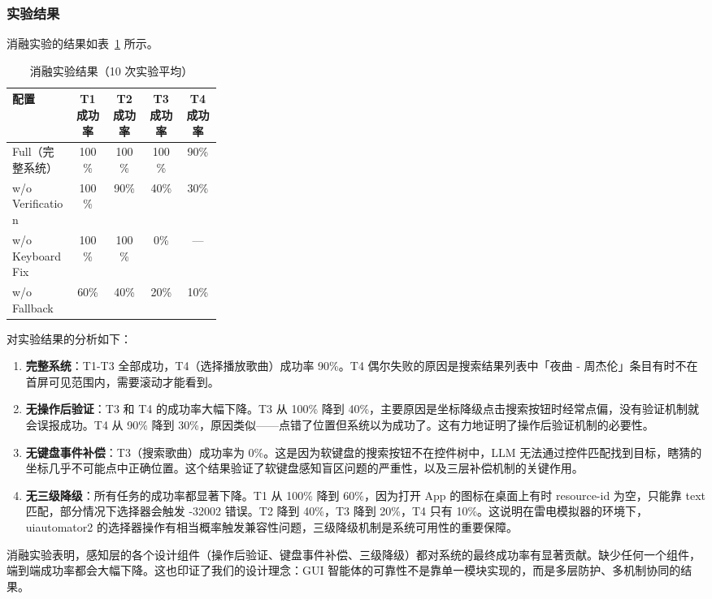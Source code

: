 \documentclass{article}
\begin{document}
\begin{CJK}{UTF8}{gbsn}
\subsubsection{实验结果}

消融实验的结果如表~\ref{tab:ablation} 所示。

\begin{table}[h]
  \centering
  \caption{消融实验结果（10 次实验平均）}
  \label{tab:ablation}
  \begin{tabular}{p{0.3\linewidth}cccc}
    \toprule
    配置 & T1 成功率 & T2 成功率 & T3 成功率 & T4 成功率 \\
    \midrule
    Full（完整系统） & 100\% & 100\% & 100\% & 90\% \\
    w/o Verification & 100\% & 90\% & 40\% & 30\% \\
    w/o Keyboard Fix & 100\% & 100\% & 0\% & — \\
    w/o Fallback & 60\% & 40\% & 20\% & 10\% \\
    \bottomrule
  \end{tabular}
\end{table}

对实验结果的分析如下：

\begin{enumerate}[leftmargin=1.5em]
  \item \textbf{完整系统}：T1-T3 全部成功，T4（选择播放歌曲）成功率 90\%。T4 偶尔失败的原因是搜索结果列表中「夜曲 - 周杰伦」条目有时不在首屏可见范围内，需要滚动才能看到。
  \item \textbf{无操作后验证}：T3 和 T4 的成功率大幅下降。T3 从 100\% 降到 40\%，主要原因是坐标降级点击搜索按钮时经常点偏，没有验证机制就会误报成功。T4 从 90\% 降到 30\%，原因类似——点错了位置但系统以为成功了。这有力地证明了操作后验证机制的必要性。
  \item \textbf{无键盘事件补偿}：T3（搜索歌曲）成功率为 0\%。这是因为软键盘的搜索按钮不在控件树中，LLM 无法通过控件匹配找到目标，瞎猜的坐标几乎不可能点中正确位置。这个结果验证了软键盘感知盲区问题的严重性，以及三层补偿机制的关键作用。
  \item \textbf{无三级降级}：所有任务的成功率都显著下降。T1 从 100\% 降到 60\%，因为打开 App 的图标在桌面上有时 resource-id 为空，只能靠 text 匹配，部分情况下选择器会触发 -32002 错误。T2 降到 40\%，T3 降到 20\%，T4 只有 10\%。这说明在雷电模拟器的环境下，uiautomator2 的选择器操作有相当概率触发兼容性问题，三级降级机制是系统可用性的重要保障。
\end{enumerate}

消融实验表明，感知层的各个设计组件（操作后验证、键盘事件补偿、三级降级）都对系统的最终成功率有显著贡献。缺少任何一个组件，端到端成功率都会大幅下降。这也印证了我们的设计理念：GUI 智能体的可靠性不是靠单一模块实现的，而是多层防护、多机制协同的结果。


\end{CJK}
\end{document}
